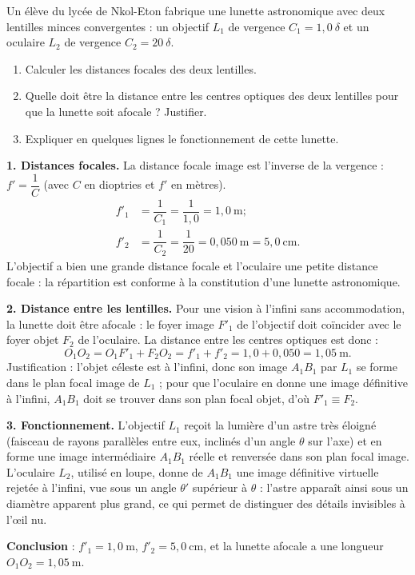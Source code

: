 \documentclass[11pt]{article}
\newcommand{\cle}[1]{{\popxbold\color{popdark}#1}}
\begin{document}
\begin{exoresolu}
Un élève du lycée de Nkol-Eton fabrique une lunette astronomique avec deux lentilles minces convergentes : un objectif $L_1$ de vergence $C_1 = 1,0\ \delta$ et un oculaire $L_2$ de vergence $C_2 = 20\ \delta$.
\begin{enumerate}
\item Calculer les distances focales des deux lentilles.
\item Quelle doit être la distance entre les centres optiques des deux lentilles pour que la lunette soit afocale ? Justifier.
\item Expliquer en quelques lignes le fonctionnement de cette lunette.
\end{enumerate}
\tcblower
\textbf{1. Distances focales.} La distance focale image est l'inverse de la vergence : $f' = \dfrac{1}{C}$ (avec $C$ en dioptries et $f'$ en mètres).
\begin{align*}
f'_1 &= \dfrac{1}{C_1} = \dfrac{1}{1,0} = 1,0\ \text{m} ;\\
f'_2 &= \dfrac{1}{C_2} = \dfrac{1}{20} = 0,050\ \text{m} = 5,0\ \text{cm}.
\end{align*}
L'objectif a bien une grande distance focale et l'oculaire une petite distance focale : la répartition est conforme à la constitution d'une lunette astronomique.

\textbf{2. Distance entre les lentilles.} Pour une vision à l'infini sans accommodation, la lunette doit être \cle{afocale} : le foyer image $F'_1$ de l'objectif doit coïncider avec le foyer objet $F_2$ de l'oculaire. La distance entre les centres optiques est donc :
\[ O_1O_2 = O_1F'_1 + F_2O_2 = f'_1 + f'_2 = 1,0 + 0,050 = 1,05\ \text{m}. \]
Justification : l'objet céleste est à l'infini, donc son image $A_1B_1$ par $L_1$ se forme dans le plan focal image de $L_1$ ; pour que l'oculaire en donne une image définitive à l'infini, $A_1B_1$ doit se trouver dans son plan focal objet, d'où $F'_1 \equiv F_2$.

\textbf{3. Fonctionnement.} L'objectif $L_1$ reçoit la lumière d'un astre très éloigné (faisceau de rayons parallèles entre eux, inclinés d'un angle $\theta$ sur l'axe) et en forme une image intermédiaire $A_1B_1$ réelle et renversée dans son plan focal image. L'oculaire $L_2$, utilisé en loupe, donne de $A_1B_1$ une image définitive virtuelle rejetée à l'infini, vue sous un angle $\theta'$ supérieur à $\theta$ : l'astre apparaît ainsi sous un diamètre apparent plus grand, ce qui permet de distinguer des détails invisibles à l'œil nu.

\textbf{Conclusion} : $f'_1 = 1,0\ \text{m}$, $f'_2 = 5,0\ \text{cm}$, et la lunette afocale a une longueur $O_1O_2 = 1,05\ \text{m}$.
\end{exoresolu}
\end{document}
